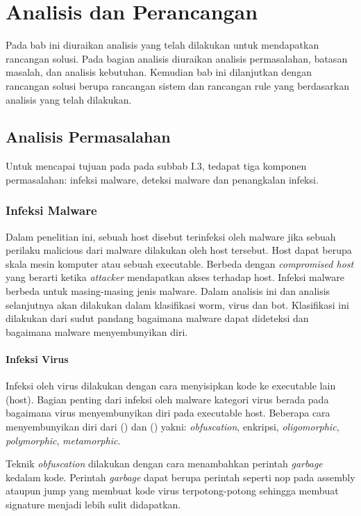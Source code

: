 \chapter{Analisis dan Perancangan}

Pada bab ini diuraikan analisis yang telah dilakukan untuk mendapatkan rancangan solusi. Pada bagian analisis diuraikan analisis permasalahan, batasan masalah, dan analisis kebutuhan. Kemudian bab ini dilanjutkan dengan rancangan solusi berupa rancangan sistem dan rancangan rule yang berdasarkan analisis yang telah dilakukan.

\section{Analisis Permasalahan}
Untuk mencapai tujuan pada pada subbab I.3, tedapat tiga komponen permasalahan: infeksi malware, deteksi malware dan penangkalan infeksi.

\subsection{Infeksi Malware}
Dalam penelitian ini, sebuah host disebut terinfeksi oleh malware jika sebuah perilaku malicious dari malware dilakukan oleh host tersebut. Host dapat berupa skala mesin komputer atau sebuah executable. Berbeda dengan \textit{compromised host} yang berarti ketika \textit{attacker} mendapatkan akses terhadap host. Infeksi malware berbeda untuk masing-masing jenis malware. Dalam analisis ini dan analisis selanjutnya akan dilakukan dalam klasifikasi worm, virus dan bot. Klasifikasi ini dilakukan dari sudut pandang bagaimana malware dapat dideteksi dan bagaimana malware menyembunyikan diri.

\subsubsection{Infeksi Virus}

Infeksi oleh virus dilakukan dengan cara menyisipkan kode ke executable lain (host). Bagian penting dari infeksi oleh malware kategori virus berada pada bagaimana virus menyembunyikan diri pada executable host. Beberapa cara menyembunyikan diri dari (\cite{6620049}) dan (\cite{alsamer2016}) yakni: \textit{obfuscation}, enkripsi, \textit{oligomorphic}, \textit{polymorphic}, \textit{metamorphic}.

Teknik \textit{obfuscation} dilakukan dengan cara menambahkan perintah \textit{garbage} kedalam kode. Perintah \textit{garbage} dapat berupa perintah seperti nop pada assembly ataupun jump yang membuat kode virus terpotong-potong sehingga membuat signature menjadi lebih sulit didapatkan.

